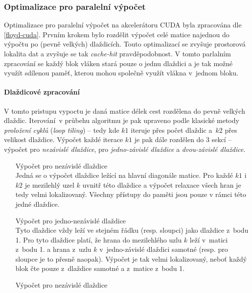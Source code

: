 \subsubsection{Optimalizace pro paralelní výpočet}
Optimalizace pro paralelní výpočet na akcelerátoru CUDA byla zpracována dle \ref{floyd-cuda}. Prvním krokem bylo rozdělit výpočet 
celé matice najednou do výpočtu po (pevně velkých) dlaždicích. Touto optimalizací se zvyšuje prostorová lokalita dat a zvyšuje
se tak \emph{cache-hit} pravděpodobnost. V tomto parlalním zpracování se každý blok vláken stará pouze o jednu dlaždici
a je tak možné využít sdílenou paměť, kterou mohou společně využít vlákna v~jednom bloku.

\paragraph{Dlaždicové zpracování}
V tomto pristupu vypoctu je daná matice délek cest rozdělena do pevně velkých dlaždic. Iterování~v průbehu algoritmu je pak
upraveno podle klasické metody \emph{proložení cyklů} (\emph{loop tiling}) -- tedy kde $k1$ iteruje přes počet dlaždic 
a~$k2$ přes velikost dlaždice. Výpočet každé iterace $k1$ je pak dále rozdělen do
3 sekcí -- výpočet pro \emph{nezávislé dlaždice}, pro \emph{jedno-závislé dlaždice} a \emph{dvou-závislé dlaždice}.
\begin{enumerate}
    \item[Výpočet pro nezávislé dlaždice] \hfil \\
        Jedná se o výpočet dlaždice ležící na hlavní diagonále matice. Pro každé $k1$ i~$k2$ je mezilehlý uzel $k$ uvnitř této
        dlaždice a výpočet relaxace všech hran je tedy velmi lokalizovaný. Všechny přístupy do paměti jsou pouze v rámci této 
        jedné dlaždice.

    \item[Výpočet pro jedno-nezávislé dlaždice] \hfil \\
        Tyto dlaždice vždy leží ve stejném řádku (resp. sloupci) jako dlaždice z~bodu 1. Pro tyto dlaždice platí, že hrana do 
        mezilehlého uzlu $k$ leží v~matici z~bodu 1. a hrana z~uzlu $k$ v~jedno-závislé dlaždici samotné (resp. pro sloupce je to 
        přesně naopak). Výpočet je tak velmi lokalizovaný, neboť každý blok čte pouze z~dlaždice samotné a z~matice z~bodu 1.

    \item[Výpočet pro nezávislé dlaždice] \hfil \\

\end{enumerate}

